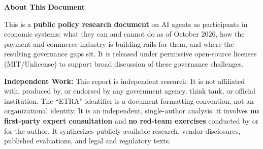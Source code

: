 \documentclass[11pt,letterpaper]{article}
\begin{document}
\thispagestyle{empty}
\vspace*{0.3cm}

\noindent{}

\vspace{0.4cm}
\begin{center}
{\color{deepindigo}\Large\bfseries About This Document}
\end{center}
\vspace{0.2cm}

\begin{tcolorbox}[enhanced, colback=lightgray, colframe=networkblue!60, boxrule=1pt, arc=3pt,
  left=10pt, right=10pt, top=10pt, bottom=10pt]
This is a \textbf{public policy research document} on AI agents as participants in economic systems: what they can and cannot do as of October 2026, how the payment and commerce industry is building rails for them, and where the resulting governance gaps sit. It is released under permissive open-source licenses (MIT/Unlicense) to support broad discussion of these governance challenges.

\textbf{Independent Work:} This report is independent research. It is not affiliated with, produced by, or endorsed by any government agency, think tank, or official institution. The ``ETRA'' identifier is a document formatting convention, not an organizational identity. It is an independent, single-author analysis: it involves \textbf{no first-party expert consultation} and \textbf{no red-team exercises} conducted by or for the author. It synthesizes publicly available research, vendor disclosures, published evaluations, and legal and regulatory texts.
\end{tcolorbox}

\vspace{0.3cm}
\end{document}
